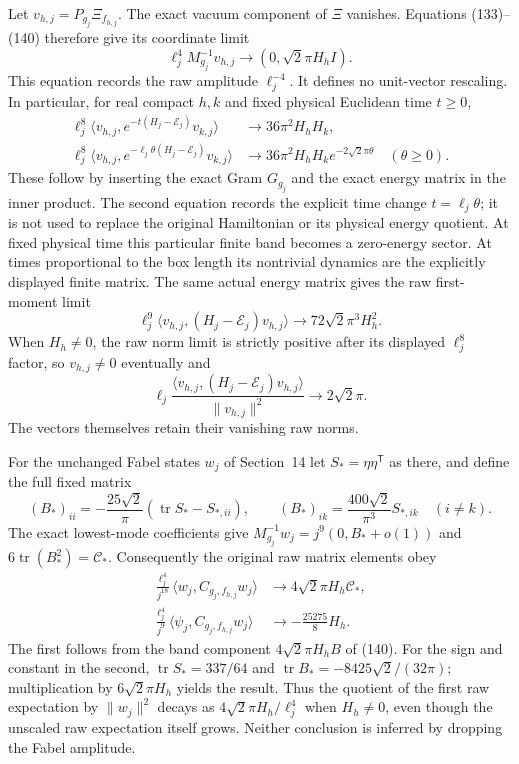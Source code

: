 \documentclass[11pt]{article}
\begin{document}
Let $v_{h,j}=P_{g_j}\Xi_{f_{h,j}}$. The exact vacuum component
of $\Xi$ vanishes. Equations (133)--(140)
therefore give its coordinate limit
\[
 \ell_j^4M_{g_j}^{-1}v_{h,j}
 \longrightarrow(0,\sqrt2\pi H_hI).
\]
This equation records the raw amplitude $\ell_j^{-4}$.
It defines no unit-vector rescaling. In particular, for real compact
$h,k$ and fixed physical Euclidean time $t\ge0$,
\begin{align}
 \ell_j^8\langle v_{h,j},e^{-t(H_j-\mathcal E_j)}v_{k,j}\rangle
 &\longrightarrow36\pi^2H_hH_k,\label{eq:local-fixed-time}\\
 \ell_j^8\langle v_{h,j},
       e^{-\ell_j\theta(H_j-\mathcal E_j)}v_{k,j}\rangle
 &\longrightarrow36\pi^2H_hH_k e^{-2\sqrt2\pi\theta}
 \quad(\theta\ge0).\label{eq:local-slow-time}
\end{align}
These follow by inserting the exact Gram $G_{g_j}$ and the exact
energy matrix in the inner product. The second equation records
the explicit time change $t=\ell_j\theta$; it is not used to replace
the original Hamiltonian or its physical energy quotient.
At fixed physical time this particular finite band becomes a
zero-energy sector. At times proportional to the box length its
nontrivial dynamics are the explicitly displayed finite matrix.
The same actual energy matrix gives the raw first-moment limit
\[
 \ell_j^9\langle v_{h,j},(H_j-\mathcal E_j)v_{h,j}\rangle
 \longrightarrow72\sqrt2\pi^3H_h^2.
\]
When $H_h\ne0$, the raw norm limit is strictly positive after its
displayed $\ell_j^8$ factor, so $v_{h,j}\ne0$ eventually and
\[
 \ell_j\frac{\langle v_{h,j},(H_j-\mathcal E_j)v_{h,j}\rangle}
                   {\|v_{h,j}\|^2}\longrightarrow2\sqrt2\pi.
\]
The vectors themselves retain their vanishing raw norms.

For the unchanged Fabel states $w_j$ of Section~14 let
$S_*=\eta\eta^{\mathsf T}$ as there, and define the full fixed matrix
\[
 (B_*)_{ii}=-\frac{25\sqrt2}{\pi}
                    (\operatorname{tr}S_*-S_{*,ii}),\qquad
 (B_*)_{ik}=\frac{400\sqrt2}{\pi^3}S_{*,ik}\quad(i\ne k).
\]
The exact lowest-mode coefficients give
$M_{g_j}^{-1}w_j=j^9(0,B_*+o(1))$ and
$6\operatorname{tr}(B_*^2)=\mathcal C_*$.
Consequently the original raw matrix elements obey
\begin{align}
 \frac{\ell_j^4}{j^{18}}
 \langle w_j,C_{g_j,f_{h,j}}w_j\rangle
 &\longrightarrow4\sqrt2\pi H_h\mathcal C_*,
 \label{eq:local-fabel-diag}\\
 \frac{\ell_j^4}{j^9}
 \langle\psi_j,C_{g_j,f_{h,j}}w_j\rangle
 &\longrightarrow-\frac{25275}{8}H_h.
 \label{eq:local-fabel-mixed}
\end{align}
The first follows from the band component $4\sqrt2\pi H_hB$ of
(140). For the sign and constant in the second,
$\operatorname{tr}S_*=337/64$ and
$\operatorname{tr}B_*=-8425\sqrt2/(32\pi)$; multiplication by
$6\sqrt2\pi H_h$ yields the result.
Thus the quotient of the first raw expectation by $\|w_j\|^2$
decays as $4\sqrt2\pi H_h/\ell_j^4$ when $H_h\ne0$,
even though the unscaled raw expectation itself grows.
Neither conclusion is inferred by dropping the Fabel amplitude.
\end{document}
